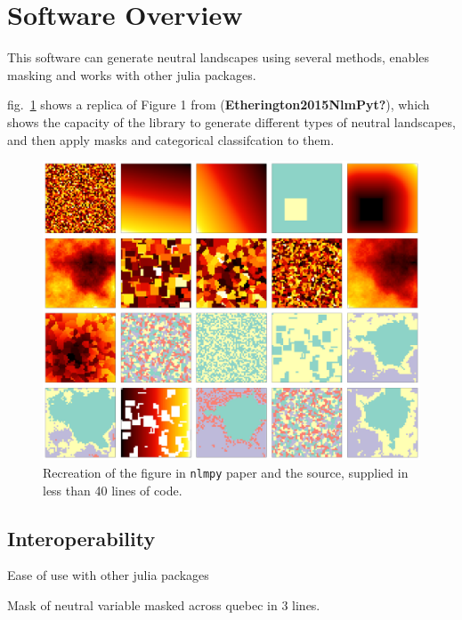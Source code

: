 \documentclass[11pt]{article}
\makeatletter
\def\maxwidth{\ifdim\Gin@nat@width>\linewidth\linewidth
\else\Gin@nat@width\fi}
\let\Oldincludegraphics\includegraphics
\renewcommand{\includegraphics}[1]{\Oldincludegraphics[width=\maxwidth]{#1}}
\makeatother
\begin{document}
\hypertarget{software-overview}{%
\section{Software Overview}\label{software-overview}}

This software can generate neutral landscapes using several methods,
enables masking and works with other julia packages.

fig.~\ref{fig:allmethods} shows a replica of Figure 1 from
(\textbf{Etherington2015NlmPyt?}), which shows the capacity of the
library to generate different types of neutral landscapes, and then
apply masks and categorical classifcation to them.

\begin{figure}
\hypertarget{fig:allmethods}{%
\centering
\includegraphics{./figures/figure1.png}
\caption{Recreation of the figure in \texttt{nlmpy} paper and the
source, supplied in less than 40 lines of code.}\label{fig:allmethods}
}
\end{figure}

\hypertarget{interoperability}{%
\subsection{Interoperability}\label{interoperability}}

Ease of use with other julia packages

Mask of neutral variable masked across quebec in 3 lines.
\end{document}
